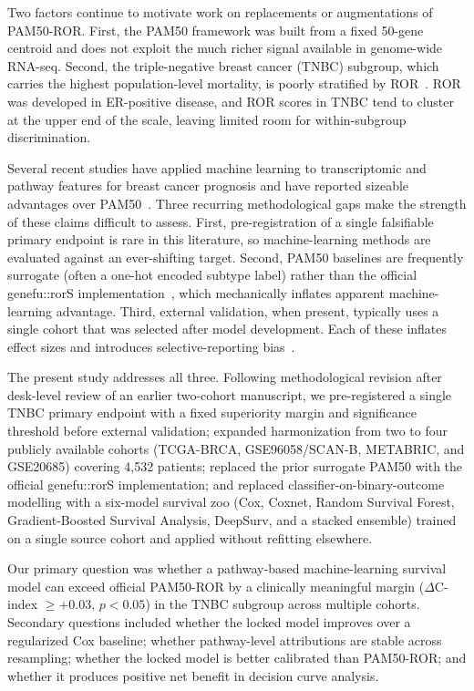 \documentclass[11pt,letterpaper]{article}
\begin{document}
Two factors continue to motivate work on replacements or augmentations of PAM50-ROR. First, the PAM50 framework was built from a fixed 50-gene centroid and does not exploit the much richer signal available in genome-wide RNA-seq. Second, the triple-negative breast cancer (TNBC) subgroup, which carries the highest population-level mortality, is poorly stratified by ROR~\cite{lehmann2011identification}. ROR was developed in ER-positive disease, and ROR scores in TNBC tend to cluster at the upper end of the scale, leaving limited room for within-subgroup discrimination.

Several recent studies have applied machine learning to transcriptomic and pathway features for breast cancer prognosis and have reported sizeable advantages over PAM50~\cite{chakraborty2021explainable,liu2021identification,kallah2025breast}. Three recurring methodological gaps make the strength of these claims difficult to assess. First, pre-registration of a single falsifiable primary endpoint is rare in this literature, so machine-learning methods are evaluated against an ever-shifting target. Second, PAM50 baselines are frequently surrogate (often a one-hot encoded subtype label) rather than the official genefu::rorS implementation~\cite{gendoo2016genefu}, which mechanically inflates apparent machine-learning advantage. Third, external validation, when present, typically uses a single cohort that was selected after model development. Each of these inflates effect sizes and introduces selective-reporting bias~\cite{rudin2019stop,nagendran2020artificial}.

The present study addresses all three. Following methodological revision after desk-level review of an earlier two-cohort manuscript, we pre-registered a single TNBC primary endpoint with a fixed superiority margin and significance threshold before external validation; expanded harmonization from two to four publicly available cohorts (TCGA-BRCA, GSE96058/SCAN-B, METABRIC, and GSE20685) covering 4,532 patients; replaced the prior surrogate PAM50 with the official genefu::rorS implementation; and replaced classifier-on-binary-outcome modelling with a six-model survival zoo (Cox, Coxnet, Random Survival Forest, Gradient-Boosted Survival Analysis, DeepSurv, and a stacked ensemble) trained on a single source cohort and applied without refitting elsewhere.

Our primary question was whether a pathway-based machine-learning survival model can exceed official PAM50-ROR by a clinically meaningful margin ($\Delta$C-index $\geq +0.03$, $p < 0.05$) in the TNBC subgroup across multiple cohorts. Secondary questions included whether the locked model improves over a regularized Cox baseline; whether pathway-level attributions are stable across resampling; whether the locked model is better calibrated than PAM50-ROR; and whether it produces positive net benefit in decision curve analysis.
\end{document}
